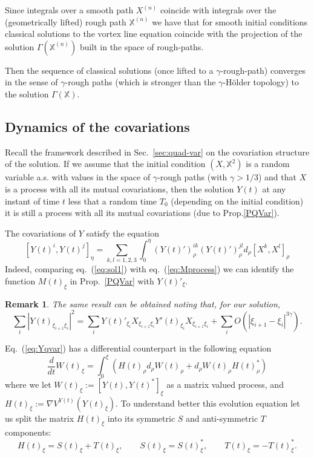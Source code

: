 \documentclass[a4paper,12pt,reqno]{amsart}
\newtheorem{remark}{Remark}
\begin{document}
Since  integrals over a smooth path $X^{(n)}$ coincide with integrals over
the (geometrically lifted) rough path $\mathbb{X}^{(n)}$ we have that for smooth initial
conditions classical solutions to the vortex line equation coincide
with the projection of the solution $\Gamma(\mathbb{X}^{(n)})$ built in the space of rough-paths.   

Then the sequence of classical solutions (once lifted to a $\gamma$-rough-path)  converges
in the sense of $\gamma$-rough paths (which is stronger than the
$\gamma$-H\"older topology) to the solution  $\Gamma(\mathbb{X})$.

\subsection{Dynamics of the covariations}
\label{sec:structure}
Recall the framework described in Sec.~\ref{sec:quad-var} on the
covariation structure of the solution. If we assume that the initial
condition $(X,\mathbb{X}^2)$ is a random variable a.s. with values in
the space of $\gamma$-rough paths (with $\gamma > 1/3$) and that $X$ is a
process with all its mutual covariations, then the solution $Y(t)$ at
any instant of time $t$ less that a random time $T_0$
(depending on the initial condition)  it is still a process with all
its mutual covariations (due to  Prop.\ref{PQVar}).    

The covariations of $Y$ satisfy the equation
\begin{equation}
  \label{eq:Yqvar}
  [ Y(t)^i,Y(t)^j ]_{\eta} = \sum_{k,l=1,2,3}
\int_{0}^{\eta} (Y(t)')^{ik}_\rho (Y(t)')^{jl}_\rho d_{\rho} [ X^k, X^l]_{\rho}
\end{equation}
Indeed, comparing
eq.~(\ref{eq:sol1}) with eq.~(\ref{eq:Mprocess}) we can identify the
function $M(t)_\xi$ in Prop.~\ref{PQVar} with $Y(t)'_\xi$.
\begin{remark}
The same result can be obtained noting that, for our solution,
\begin{equation*}
 \sum_i |Y(t)_{\xi_{i+1} \xi_{i}}|^2 = \sum_i Y(t)'_{\xi_i} X_{\xi_{i+1}
 \xi_{i}} Y'(t)_{\xi_i} X_{\xi_{i+1} \xi_{i}} + \sum_i O(|\xi_{i+1}-\xi_i|^{3\gamma})
.
\end{equation*}  
\end{remark}

Eq.~(\ref{eq:Yqvar}) has a differential counterpart in the following equation
\begin{equation}
  \label{eq:dyn-Yqvar}
\frac{d}{dt} W(t)_\xi = \int_0^\xi (H(t)_\rho d_\rho W(t)_\rho 
+  d_\rho W(t)_\rho H(t)_\rho^*)
\end{equation}
where we let $W(t)_\xi := [Y(t),Y(t)^*]_\xi$ as a matrix valued process, and 
$H(t)_\xi := \nabla V^{Y(t)}(Y(t)_\xi)$. 
To understand better this evolution equation let us split the matrix
$H(t)_\xi$ into its symmetric $S$ and anti-symmetric $T$ components:
$$
H(t)_\xi = S(t)_\xi + T(t)_\xi, \qquad S(t)_\xi = S(t)_\xi^*,\qquad T(t)_\xi
= - T(t)_\xi^*.
$$
\end{document}

